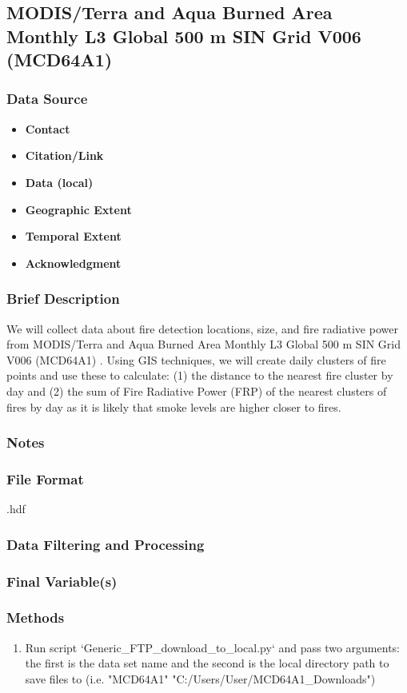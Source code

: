 \subsection{MODIS/Terra and Aqua Burned Area Monthly L3 Global 500 m SIN Grid V006 (MCD64A1) }
\subsubsection*{Data Source}
\begin{itemize}[nolistsep]
\item \textbf{Contact}
\item \textbf{Citation/Link}
\item \textbf{Data (local)}
\item \textbf{Geographic Extent}
\item \textbf{Temporal Extent}
\item \textbf{Acknowledgment}
\end{itemize}
\subsubsection*{Brief Description}

We will collect data about fire detection locations, size, and fire radiative power from MODIS/Terra and Aqua Burned Area Monthly L3 Global 500 m SIN Grid V006 (MCD64A1) 
\citep{Schroeder2014}. %
Using GIS techniques, we will create daily clusters of fire points and use these to calculate: (1) the distance to the nearest fire cluster by day and (2) the sum of Fire Radiative Power (FRP) of the nearest clusters of fires by day as it is likely that smoke levels are higher closer to fires.

\subsubsection*{Notes}
\subsubsection*{File Format} .hdf
\subsubsection*{Data Filtering and Processing}
\subsubsection*{Final Variable(s)}
\subsubsection*{Methods}
\begin{enumerate}
\item Run script `Generic_FTP_download_to_local.py` and pass two arguments: the first is the data set name and the second is the local directory path to save files to (i.e. "MCD64A1" "C:/Users/User/MCD64A1\_Downloads")
\end{enumerate}
